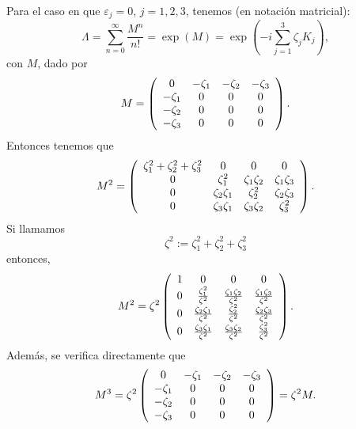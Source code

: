 Para el caso en que $\varepsilon_j=0$, $j=1,2,3$, tenemos (en notación
matricial):
\begin{equation}
\Lambda=\sum_{n=0}^{\infty}\frac{M^{n}}{n!}=\exp(M)=\exp\left(
-i\sum_{j=1}^3\zeta_j K_j\right),
\end{equation}
con $M$, dado por
\begin{equation}
M=\left(
\begin{array}
[c]{cccc}
0 & -\zeta_1 & -\zeta_2 & -\zeta_3\\
-\zeta_1 & 0 & 0 & 0\\
-\zeta_2 & 0 & 0 & 0\\
-\zeta_3 & 0 & 0 & 0
\end{array}
\right).
\end{equation}
Entonces tenemos que
\begin{equation}
M^2=\left(
\begin{array}
[c]{cccc}
\zeta_1^2+\zeta_2^2+\zeta_3^2 & 0 & 0 & 0\\
0 & \zeta_1^2 & \zeta_1\zeta_2 & \zeta_1\zeta_3\\
0 & \zeta_2\zeta_1 & \zeta_2^2 & \zeta_2\zeta_3\\
0 & \zeta_3\zeta_1 & \zeta_3\zeta_2 & \zeta_3^2
\end{array}
\right).
\end{equation}
Si llamamos
\begin{equation}
\zeta^2:=\zeta_1^2+\zeta_2^2+\zeta_3^2
\end{equation}
entonces,
\begin{equation}
M^2=\zeta^2\left(
\begin{array}
[c]{cccc}
1 & 0 & 0 & 0\\
0 & \frac{\zeta_1^2}{\zeta^2} & \frac{\zeta_1\zeta_2}{\zeta^2} &
\frac{\zeta_1\zeta_3}{\zeta^2}\\
0 & \frac{\zeta_2\zeta_1}{\zeta^2} & \frac{\zeta_2^2}{\zeta^2} &
\frac{\zeta_2\zeta_3}{\zeta^2}\\
0 & \frac{\zeta_3\zeta_1}{\zeta^2} & \frac{\zeta_3\zeta_2}{\zeta
^2} & \frac{\zeta_3^2}{\zeta^2}
\end{array}
\right).
\end{equation}
Además, se verifica directamente que
\begin{equation}
M^3=\zeta^2\left(
\begin{array}
[c]{cccc}
0 & -\zeta_1 & -\zeta_2 & -\zeta_3\\
-\zeta_1 & 0 & 0 & 0\\
-\zeta_2 & 0 & 0 & 0\\
-\zeta_3 & 0 & 0 & 0
\end{array}
\right)=\zeta^2 M .
\end{equation}
